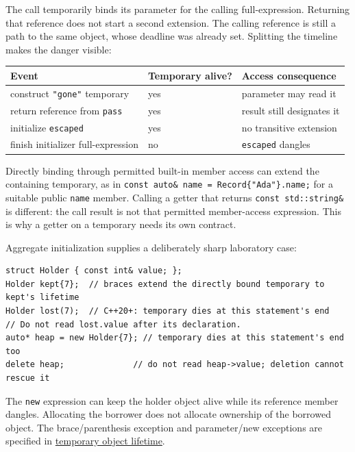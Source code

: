 The call temporarily binds its parameter for the calling full-expression. Returning that reference does not start a second extension. The calling reference is still a path to the same object, whose deadline was already set. Splitting the timeline makes the danger visible:

{\def\LTcaptype{none} %
\begin{longtable}[]{@{}lll@{}}
\toprule\noalign{}
Event & Temporary alive? & Access consequence \\
\midrule\noalign{}
\endhead
\bottomrule\noalign{}
\endlastfoot
construct \texttt{"gone"} temporary & yes & parameter may read it \\
return reference from \texttt{pass} & yes & result still designates it \\
initialize \texttt{escaped} & yes & no transitive extension \\
finish initializer full-expression & no & \texttt{escaped} dangles \\
\end{longtable}
}

Directly binding through permitted built-in member access can extend the containing temporary, as in \texttt{const\ auto\&\ name\ =\ Record\{"Ada"\}.name;} for a suitable public \texttt{name} member. Calling a getter that returns \texttt{const\ std::string\&} is different: the call result is not that permitted member-access expression. This is why a getter on a temporary needs its own contract.

Aggregate initialization supplies a deliberately sharp laboratory case:

\begin{verbatim}
struct Holder { const int& value; };
Holder kept{7};  // braces extend the directly bound temporary to kept's lifetime
Holder lost(7);  // C++20+: temporary dies at this statement's end
// Do not read lost.value after its declaration.
auto* heap = new Holder{7}; // temporary dies at this statement's end too
delete heap;              // do not read heap->value; deletion cannot rescue it
\end{verbatim}

The \texttt{new} expression can keep the holder object alive while its reference member dangles. Allocating the borrower does not allocate ownership of the borrowed object. The brace/parenthesis exception and parameter/new exceptions are specified in \href{https://eel.is/c++draft/class.temporary}{temporary object lifetime}.

